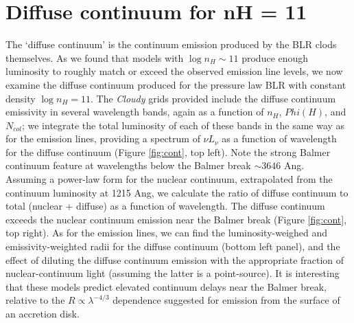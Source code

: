 \documentclass[paper=a4, fontsize=11pt]{scrartcl} %
\numberwithin{equation}{section} %
\numberwithin{figure}{section} %
\numberwithin{table}{section} %
\begin{document}
\section{Diffuse continuum for nH = 11}

The `diffuse continuum' is the continuum emission produced by the BLR clods themselves. As we found that models with $\log n_H\sim11$ produce enough luminosity to roughly match or exceed the observed emission line levels, we now examine the diffuse continuum produced for the pressure law BLR with constant density $\log n_H=11$. The \emph{Cloudy} grids provided include the diffuse continuum emissivity in several wavelength bands, again as a function of $n_H$, $Phi(H)$, and $N_{col}$; we integrate the total luminosity of each of these bands in the same way as for the emission lines, providing a spectrum of $\nu L_{\nu}$ as a function of wavelength for the diffuse continuum (Figure \ref{fig:cont}, top left). Note the strong Balmer continuum feature at wavelengths below the Balmer break $\sim3646$ Ang.\\

Assuming a power-law form for the nuclear continuum, extrapolated from the continuum luminosity at 1215 Ang, we calculate the ratio of diffuse continuum to total (nuclear + diffuse) as a function of wavelength. The diffuse continuum exceeds the nuclear continuum emission near the Balmer break (Figure \ref{fig:cont}, top right). As for the emission lines, we can find the luminosity-weighed and emissivity-weighted radii for the diffuse continuum (bottom left panel), and the effect of diluting the diffuse continuum emission with the appropriate fraction of nuclear-continuum light (assuming the latter is a point-source). It is interesting that these models predict elevated continuum delays near the Balmer break, relative to the $R\propto\lambda^{-4/3}$ dependence suggested for emission from the surface of an accretion disk.
\end{document}
